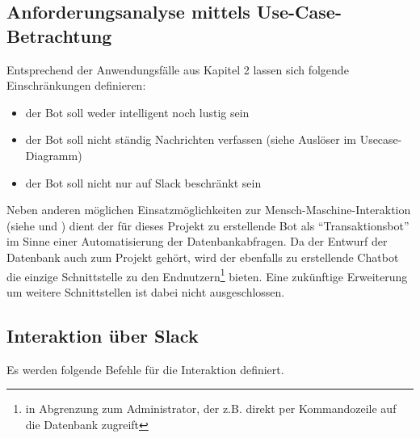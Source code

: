 \subsection{Anforderungsanalyse mittels Use-Case-Betrachtung}

Entsprechend der Anwendungsfälle aus Kapitel 2 lassen sich folgende Einschränkungen definieren:

\begin{itemize}
    \item der Bot soll weder intelligent noch lustig sein
    \item der Bot soll nicht ständig Nachrichten verfassen (siehe Auslöser im Usecase-Diagramm)
    \item der Bot soll nicht nur auf Slack beschränkt sein
\end{itemize}

Neben anderen möglichen Einsatzmöglichkeiten zur Mensch-Maschine-Interaktion (siehe \cite{PanConversationalInterfacesFuture2017} und \cite{GruensteinConversationalInterfaces2009}) dient der für dieses Projekt zu erstellende Bot als \enquote{Transaktionsbot} im Sinne einer Automatisierung der Datenbankabfragen. Da der Entwurf der Datenbank auch zum Projekt gehört, wird der ebenfalls zu erstellende Chatbot die einzige Schnittstelle zu den Endnutzern\footnote{in Abgrenzung zum Administrator, der z.B. direkt per Kommandozeile auf die Datenbank zugreift} bieten. Eine zukünftige Erweiterung um weitere Schnittstellen ist dabei nicht ausgeschlossen.

\subsection{Interaktion über Slack}

Es werden folgende Befehle für die Interaktion definiert.

